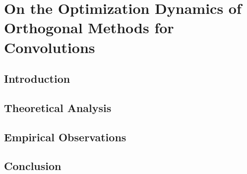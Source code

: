 \chapter{On the Optimization Dynamics of Orthogonal Methods for Convolutions}
\label{ch:muon_convolutions}

\section{Introduction}
\section{Theoretical Analysis}
\section{Empirical Observations}
\section{Conclusion}
